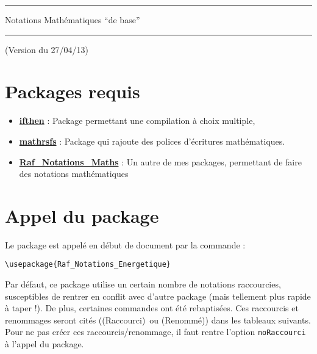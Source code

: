 \documentclass[a4paper,10pt]{article}
\newcommand{\rac}{({\color{red}Raccourci})}
\newcommand{\ren}{({\color{blue}Renommé})}
\begin{document}
	\begin{center}
		\hrule{\Large Notations Mathématiques ``de base''}\\\hrule
	\end{center}

	(Version du 27/04/13)

	\section{Packages requis}

	\begin{itemize}
		\item \href{http://www.ctan.org/pkg/ifthen}{\textbf{ifthen}} : Package permettant une compilation à choix multiple,
		\item \href{http://www.ctan.org/pkg/mathrsfs}{\textbf{mathrsfs}} : Package qui rajoute des polices d'écritures mathématiques.
		\item \href{http://enseignement.allais.eu/page-latex}{\textbf{Raf\_Notations\_Maths}} : Un autre de mes packages, permettant de faire des notations mathématiques
	\end{itemize}

	\section{Appel du package}

	Le package est appelé en début de document par la commande :
	\begin{verbatim}
\usepackage{Raf_Notations_Energetique}
	\end{verbatim}

	Par défaut, ce package utilise un certain nombre de notations raccourcies, susceptibles de rentrer en conflit avec d'autre package (mais tellement plus rapide à taper !).
	De plus, certaines commandes ont été rebaptisées.
	Ces raccourcis et renommages seront cités (\rac\ ou \ren) dans les tableaux suivants.
	Pour ne pas créer ces raccourcis/renommage, il faut rentre l'option \verb!noRaccourci! à l'appel du package.
\end{document}
